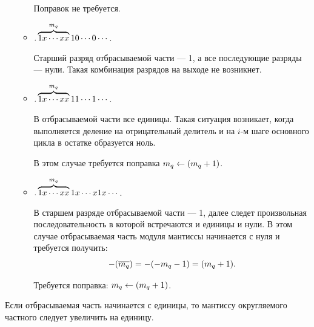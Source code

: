 \begin{itemize}
\begin{itemize}
        Поправок не требуется.
        
        \item $.\overbrace{1x\cdots xx}^{m_{q}} 10\cdots 0\cdots$.
        
        Старший разряд отбрасываемой части --- 1, а все последующие разряды --- нули. Такая комбинация разрядов на выходе не возникнет.

        \item $.\overbrace{1x\cdots xx}^{m_{q}} 11\cdots 1\cdots$.
        
        В отбрасываемой части все единицы. Такая ситуация возникает, когда выполняется деление на отрицательный делитель и на $i$-м шаге основного цикла в остатке образуется ноль. 
        
        В этом случае требуется поправка $m_{q}\gets(m_{q}+1)$.
        
        \item $.\overbrace{1x\cdots xx}^{m_{q}} 1x\cdots x1x\cdots$.
        
        В старшем разряде отбрасываемой части --- 1, далее следет произвольная последовательность в которой встречаются и единицы и нули. В этом случае отбрасываемая часть модуля мантиссы начинается с нуля и требуется получить:
        \[-(\overline{m_{q}})=-(-m_{q}-1)=(m_{q}+1).\]
        
        Требуется поправка: $m_{q}\gets(m_{q}+1)$.
        
    \end{itemize}
\end{itemize}

\begin{Rule}
    Если отбрасываемая часть начинается с единицы, то мантиссу округляемого частного следует увеличить на единицу.
\end{Rule}


